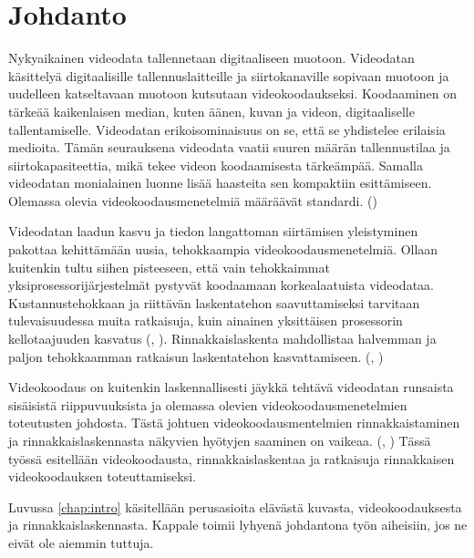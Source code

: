 
\section{Johdanto}

Nykyaikainen videodata tallennetaan digitaaliseen muotoon. Videodatan
käsittelyä digitaalisille tallennuslaitteille ja siirtokanaville sopivaan
muotoon ja uudelleen katseltavaan muotoon kutsutaan videokoodaukseksi.
Koodaaminen on tärkeää kaikenlaisen median, kuten äänen, kuvan ja videon,
digitaaliselle tallentamiselle. Videodatan erikoisominaisuus on se, että
se yhdistelee erilaisia medioita. Tämän seurauksena videodata vaatii suuren
määrän tallennustilaa ja siirtokapasiteettia, mikä tekee videon koodaamisesta
tärkeämpää. Samalla videodatan monialainen luonne lisää haasteita sen
kompaktiin esittämiseen. Olemassa olevia videokoodausmenetelmiä määräävät
standardi. (\citealt{h264})

Videodatan laadun kasvu ja tiedon langattoman siirtämisen yleistyminen pakottaa
kehittämään uusia, tehokkaampia videokoodausmenetelmiä. Ollaan kuitenkin tultu
siihen pisteeseen, että vain tehokkaimmat yksiprosessorijärjestelmät pystyvät
koodaamaan korkealaatuista videodataa. Kustannustehokkaan ja riittävän
laskentatehon saavuttamiseksi tarvitaan tulevaisuudessa muita ratkaisuja, kuin
ainainen yksittäisen prosessorin kellotaajuuden kasvatus (\citealt{moore}, \citealt{vajda}). Rinnakkaislaskenta
mahdollistaa halvemman ja paljon tehokkaamman ratkaisun laskentatehon
kasvattamiseen. (\citealt{xu}, \citealt{chi})

Videokoodaus on kuitenkin laskennallisesti jäykkä tehtävä videodatan runsaista
sisäisistä riippuvuuksista ja olemassa olevien videokoodausmenetelmien
toteutusten johdosta. Tästä johtuen videokoodausmentelmien rinnakkaistaminen ja
rinnakkaislaskennasta näkyvien hyötyjen saaminen on vaikeaa.
(\citealt{pieters}, \citealt{li}) Tässä työssä esitellään videokoodausta,
rinnakkaislaskentaa ja ratkaisuja rinnakkaisen videokoodauksen toteuttamiseksi.

Luvussa \ref{chap:intro} käsitellään perusasioita elävästä kuvasta,
videokoodauksesta ja rinnakkaislaskennasta. Kappale toimii lyhyenä johdantona
työn aiheisiin, jos ne eivät ole aiemmin tuttuja.

